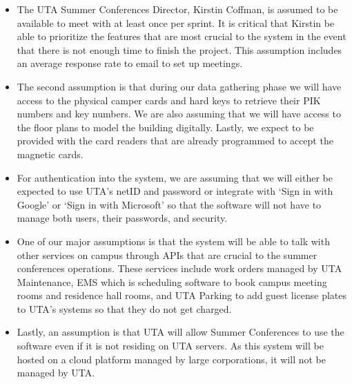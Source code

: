 \begin{itemize}
  \item The UTA Summer Conferences Director, Kirstin Coffman, is assumed to be available to meet with at least once per sprint. It is critical that Kirstin be able to prioritize the features that are most crucial to the system in the event that there is not enough time to finish the project. This assumption includes an average response rate to email to set up meetings.
  
  \item The second assumption is that during our data gathering phase we will have access to the physical camper cards and hard keys to retrieve their PIK numbers and key numbers. We are also assuming that we will have access to the floor plans to model the building digitally. Lastly, we expect to be provided with the card readers that are already programmed to accept the magnetic cards.
  
  \item For authentication into the system, we are assuming that we will either be expected to use UTA’s netID and password or integrate with ‘Sign in with Google’ or ‘Sign in with Microsoft’ so that the software will not have to manage both users, their passwords, and security.
  
  \item One of our major assumptions is that the system will be able to talk with other services on campus through APIs that are crucial to the summer conferences operations. These services include work orders managed by UTA Maintenance, EMS which is scheduling software to book campus meeting rooms and residence hall rooms, and UTA Parking to add guest license plates to UTA's systems so that they do not get charged.
  
  \item Lastly, an assumption is that UTA will allow Summer Conferences to use the software even if it is not residing on UTA servers. As this system will be hosted on a cloud platform managed by large corporations, it will not be managed by UTA.
  \end{itemize}
  